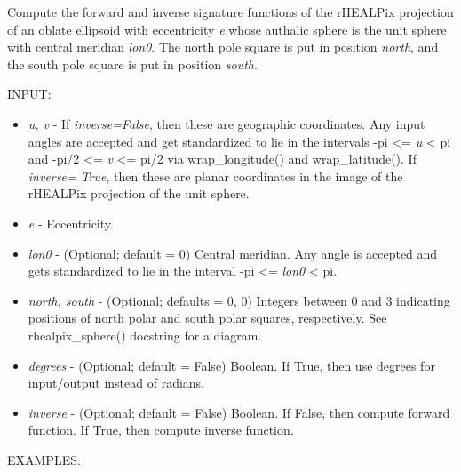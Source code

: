 \documentclass[a4paper,12ptopenany,oneside]{sphinxmanual}
\begin{document}
\begin{fulllineitems}
\label{projections:projections.rhealpix_ellipsoid}
Compute the forward and inverse signature functions of the rHEALPix 
projection of an oblate ellipsoid with eccentricity \emph{e} whose 
authalic sphere is the unit sphere with central meridian \emph{lon0}. 
The north pole square is put in position \emph{north}, and the south pole
square is put in position \emph{south}.

INPUT:
\begin{itemize}
\item {} 
\emph{u, v} - If \emph{inverse=False}, then these are geographic coordinates.
Any input angles are accepted and get standardized to lie in the 
intervals 
-pi \textless{}= \emph{u} \textless{} pi and -pi/2 \textless{}= \emph{v} \textless{}= pi/2 via wrap\_longitude() and 
wrap\_latitude().
If \emph{inverse= True}, then these are planar coordinates in the
image of the rHEALPix projection of the unit sphere.

\item {} 
\emph{e} - Eccentricity.

\item {} 
\emph{lon0} - (Optional; default = 0) Central meridian. Any angle is accepted
and gets standardized to lie in the interval -pi \textless{}= \emph{lon0} \textless{} pi.

\item {} 
\emph{north, south} - (Optional; defaults = 0, 0) Integers between 0 and 3 
indicating positions of north polar and south polar squares, 
respectively.
See rhealpix\_sphere() docstring for a diagram.

\item {} 
\emph{degrees} - (Optional; default = False) Boolean. If True, then use 
degrees for input/output instead of radians.

\item {} 
\emph{inverse} - (Optional; default = False) Boolean. If False, then compute
forward function. If True, then compute inverse function.

\end{itemize}

EXAMPLES:


\end{fulllineitems}
\end{document}
